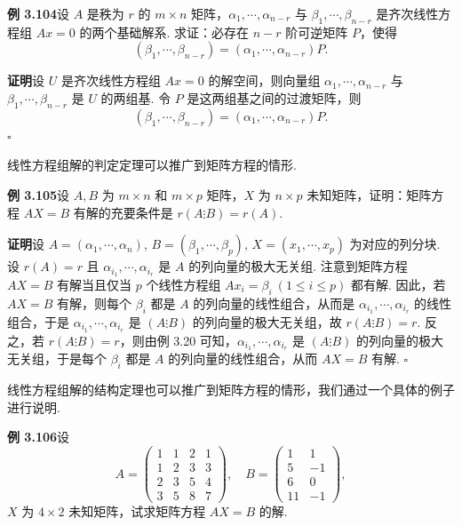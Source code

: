 \documentclass[UTF8,12pt,a4paper,fontset=fandol]{ctexart}
\begin{document}
\noindent\textbf{例 3.104}\quad 设 $A$ 是秩为 $r$ 的 $m\times n$ 矩阵，$\alpha_1,\cdots,\alpha_{n-r}$ 与 $\beta_1,\cdots,\beta_{n-r}$ 是齐次线性方程组 $Ax=0$ 的两个基础解系. 求证：必存在 $n-r$ 阶可逆矩阵 $P$，使得
\[
(\beta_1,\cdots,\beta_{n-r})=(\alpha_1,\cdots,\alpha_{n-r})P.
\]

\noindent\textbf{证明}\quad 设 $U$ 是齐次线性方程组 $Ax=0$ 的解空间，则向量组 $\alpha_1,\cdots,\alpha_{n-r}$ 与 $\beta_1,\cdots,\beta_{n-r}$ 是 $U$ 的两组基. 令 $P$ 是这两组基之间的过渡矩阵，则
\[
(\beta_1,\cdots,\beta_{n-r})=(\alpha_1,\cdots,\alpha_{n-r})P.
\]
$\square$

线性方程组解的判定定理可以推广到矩阵方程的情形.

\noindent\textbf{例 3.105}\quad 设 $A,B$ 为 $m\times n$ 和 $m\times p$ 矩阵，$X$ 为 $n\times p$ 未知矩阵，证明：矩阵方程 $AX=B$ 有解的充要条件是 $r(A\vdots B)=r(A)$.

\noindent\textbf{证明}\quad 设 $A=(\alpha_1,\cdots,\alpha_n)$, $B=(\beta_1,\cdots,\beta_p)$, $X=(x_1,\cdots,x_p)$ 为对应的列分块. 设 $r(A)=r$ 且 $\alpha_{i_1},\cdots,\alpha_{i_r}$ 是 $A$ 的列向量的极大无关组. 注意到矩阵方程 $AX=B$ 有解当且仅当 $p$ 个线性方程组 $Ax_i=\beta_i\ (1\le i\le p)$ 都有解. 因此，若 $AX=B$ 有解，则每个 $\beta_i$ 都是 $A$ 的列向量的线性组合，从而是 $\alpha_{i_1},\cdots,\alpha_{i_r}$ 的线性组合，于是 $\alpha_{i_1},\cdots,\alpha_{i_r}$ 是 $(A\vdots B)$ 的列向量的极大无关组，故 $r(A\vdots B)=r$. 反之，若 $r(A\vdots B)=r$，则由例 3.20 可知，$\alpha_{i_1},\cdots,\alpha_{i_r}$ 是 $(A\vdots B)$ 的列向量的极大无关组，于是每个 $\beta_i$ 都是 $A$ 的列向量的线性组合，从而 $AX=B$ 有解. $\square$

线性方程组解的结构定理也可以推广到矩阵方程的情形，我们通过一个具体的例子进行说明.

\noindent\textbf{例 3.106}\quad 设
\[
A=\begin{pmatrix}
1&1&2&1\\
1&2&3&3\\
2&3&5&4\\
3&5&8&7
\end{pmatrix},\quad
B=\begin{pmatrix}
1&1\\
5&-1\\
6&0\\
11&-1
\end{pmatrix},
\]
$X$ 为 $4\times 2$ 未知矩阵，试求矩阵方程 $AX=B$ 的解.
\end{document}
